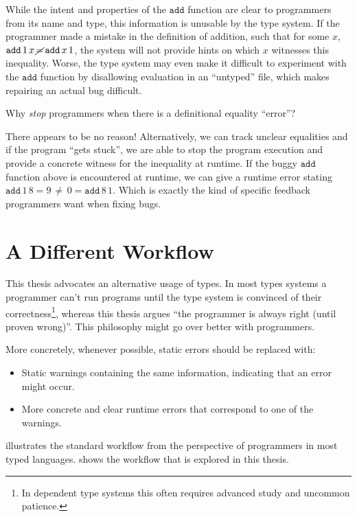While the intent and properties of the $\mathtt{add}$ function are clear to programmers from its name and type, this information is unusable by the type system.
If the programmer made a mistake in the definition of addition, such that for some $x$, $\mathtt{add}\,1\,x\,\cancel{=}\,\mathtt{add}\,x\,1$, the system will not provide hints on which $x$ witnesses this inequality.
Worse, the type system may even make it difficult to experiment with the $\mathtt{add}$ function by disallowing evaluation in an ``untyped'' file, which makes repairing an actual bug difficult.

Why \emph{stop} programmers when there is a definitional equality ``error''? 

There appears to be no reason!
Alternatively, we can track unclear equalities and if the program ``gets stuck'', we are able to stop the program execution and provide a concrete witness for the inequality at runtime.
If the buggy $\mathtt{add}$ function above is encountered at runtime, we can give a runtime error stating $\mathtt{add}\,1\,8=9\,\neq\,0=\mathtt{add}\,8\,1$.
Which is exactly the kind of specific feedback programmers want when fixing bugs.

\section{A Different Workflow}

This thesis advocates an alternative usage of types. In most types systems a programmer can't run programs until the type system is convinced of their correctness\footnote{
 In dependent type systems this often requires advanced study and uncommon patience.
}, whereas this thesis argues ``the programmer is always right (until proven wrong)''.
This philosophy might go over better with programmers.

More concretely, whenever possible, static errors should be replaced with:
\begin{itemize}
\item Static warnings containing the same information, indicating that an error might occur.
\item More concrete and clear runtime errors that correspond to one of the warnings.
\end{itemize}
 illustrates the standard workflow from the perspective of programmers in most typed languages.
 shows the workflow that is explored in this thesis.

